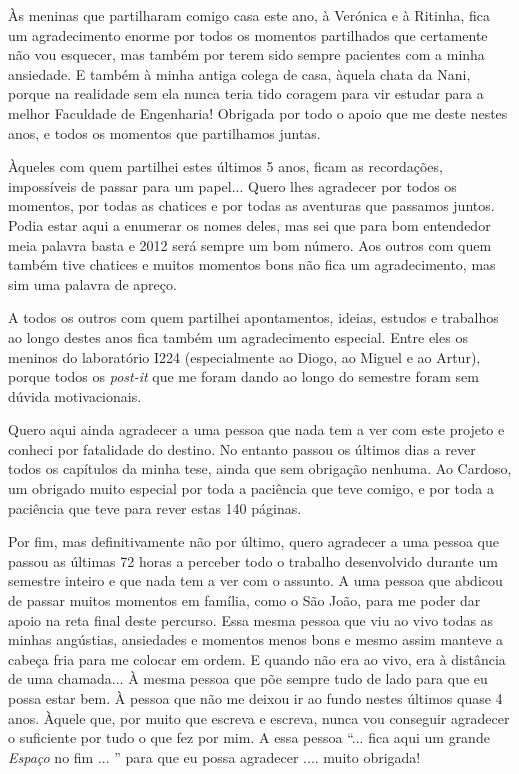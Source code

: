 Às meninas que partilharam comigo casa este ano, à Verónica e à Ritinha, fica um agradecimento enorme por todos os momentos partilhados que certamente não vou esquecer, mas também por terem sido sempre pacientes com a minha ansiedade. E também à minha antiga colega de casa, àquela chata da Nani, porque na realidade sem ela nunca teria tido coragem para vir estudar para a melhor Faculdade de Engenharia! Obrigada por todo o apoio que me deste nestes anos, e todos os momentos que partilhamos juntas.

Àqueles com quem partilhei estes últimos 5 anos, ficam as recordações, impossíveis de passar para um papel... Quero lhes agradecer por todos os momentos, por todas as chatices e por todas as aventuras que passamos juntos. Podia estar aqui a enumerar os nomes deles, mas sei que para bom entendedor meia palavra basta e 2012 será sempre um bom número. Aos outros com quem também tive chatices e muitos momentos bons não fica um agradecimento, mas sim uma palavra de apreço.

A todos os outros com quem partilhei apontamentos, ideias, estudos e trabalhos ao longo destes anos fica também um agradecimento especial. Entre eles os meninos do laboratório I224 (especialmente ao Diogo, ao Miguel e ao Artur), porque todos os \textit{post-it} que me foram dando ao longo do semestre foram sem dúvida motivacionais. 

Quero aqui ainda agradecer a uma pessoa que nada tem a ver com este projeto e conheci por fatalidade do destino. No entanto passou os últimos dias a rever todos os capítulos da minha tese, ainda que sem obrigação nenhuma. Ao Cardoso, um obrigado muito especial por toda a paciência que teve comigo, e por toda a paciência que teve para rever estas 140 páginas.

Por fim, mas definitivamente não por último, quero agradecer a uma pessoa que passou as últimas 72 horas a perceber todo o trabalho desenvolvido durante um semestre inteiro e que nada tem a ver com o assunto. A uma pessoa que abdicou de passar muitos momentos em família, como o São João, para me poder dar apoio na reta final deste percurso. Essa mesma pessoa que viu ao vivo todas as minhas angústias, ansiedades e momentos menos bons e mesmo assim manteve a cabeça fria para me colocar em ordem. E quando não era ao vivo, era à distância de uma chamada... À mesma pessoa que põe sempre tudo de lado para que eu possa estar bem. À pessoa que não me deixou ir ao fundo nestes últimos quase 4 anos. Àquele que, por muito que escreva e escreva, nunca vou conseguir agradecer o suficiente por tudo o que fez por mim.  A essa pessoa ``... fica aqui um grande \textit{Espaço} no fim ... '' para que eu possa agradecer .... muito obrigada!

\vspace{10mm}
